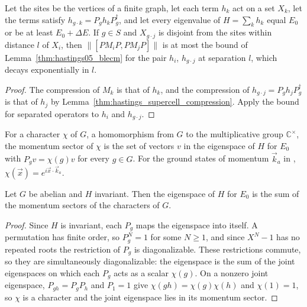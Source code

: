 \begin{lemma}
    \label{thm:hastings_supercell_decay}
    \leanok
    Let the sites be the vertices of a finite graph, let each term $h_k$ act on
    a set $X_k$, let the terms satisfy $h_{g\cdot k}=P_gh_kP_g^\dagger$, and let
    every eigenvalue of $H=\sum_kh_k$ equal $E_0$ or be at least $E_0+\Delta E$.
    If $g\in S$ and $X_{g\cdot j}$ is disjoint from the sites within distance $l$
    of $X_i$, then $\|[PM_iP,PM_jP]\|$ is at most the bound of
    Lemma~\ref{thm:hastings05_blecm} for the pair $h_i$, $h_{g\cdot j}$ at
    separation $l$, which decays exponentially in $l$.
\end{lemma}
\begin{proof}\leanok
    The compression of $M_k$ is that of $h_k$, and the compression of
    $h_{g\cdot j}=P_gh_jP_g^\dagger$ is that of $h_j$ by
    Lemma~\ref{thm:hastings_supercell_compression}. Apply the bound for
    separated operators to $h_i$ and $h_{g\cdot j}$.
\end{proof}

\begin{definition}
    \label{def:hastings_momentum_sector}
    \leanok
    For a character $\chi$ of $G$, a homomorphism from $G$ to the multiplicative
    group $\mathbb{C}^\times$, the
    momentum sector of $\chi$ is the set of vectors $v$ in the eigenspace of $H$
    for $E_0$ with $P_gv=\chi(g)v$ for every $g\in G$. For the ground states of
    momentum $\vec k_a$ in \cite[lines 1613--1618]{Hastings2006Solving},
    $\chi(\vec x)=e^{i\vec x\cdot\vec k_a}$.
\end{definition}

\begin{lemma}
    \label{thm:hastings_momentum_sectors_span}
    \leanok
    Let $G$ be abelian and $H$ invariant. Then the eigenspace of $H$ for $E_0$ is
    the sum of the momentum sectors of the characters of $G$.
\end{lemma}
\begin{proof}\leanok
    Since $H$ is invariant, each $P_g$ maps the eigenspace into itself. A
    permutation has finite order, so $P_g^N=1$ for some $N\ge1$, and since
    $X^N-1$ has no repeated roots the restriction of $P_g$ is diagonalizable.
    These restrictions commute, so they are simultaneously diagonalizable: the
    eigenspace is the sum of the joint eigenspaces on which each $P_g$ acts as
    a scalar $\chi(g)$. On a nonzero joint eigenspace,
    $P_{gh}=P_gP_h$ and $P_1=1$ give $\chi(gh)=\chi(g)\chi(h)$ and $\chi(1)=1$,
    so $\chi$ is a character and the joint eigenspace lies in its momentum
    sector.
\end{proof}

